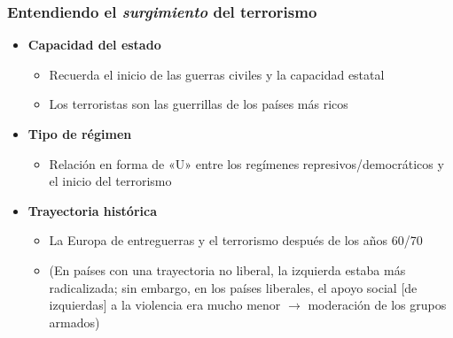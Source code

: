 \begin{frame}
\frametitle{Entendiendo el \textit{surgimiento} del terrorismo}
\centering

\begin{itemize}
  \item[1.] \textbf{Capacidad del estado}
  \begin{itemize}
    \item Recuerda el inicio de las guerras civiles y la capacidad estatal
    \item Los terroristas son las guerrillas de los países más ricos
  \end{itemize}
  \item<2->[2.] \textbf{Tipo de régimen}
  \begin{itemize}
    \item Relación en forma de «U» entre los regímenes represivos/democráticos y el inicio del terrorismo
  \end{itemize}
  \item<3->[3.] \textbf{Trayectoria histórica}
  \begin{itemize}
    \item La Europa de entreguerras y el terrorismo después de los años 60/70
    \item[] {\scriptsize (En países con una trayectoria no liberal, la izquierda estaba más radicalizada; sin embargo, en los países liberales, el apoyo social [de izquierdas] a la violencia era mucho menor $\rightarrow$ moderación de los grupos armados)}
  \end{itemize}
\end{itemize}

\end{frame}
\note{}




